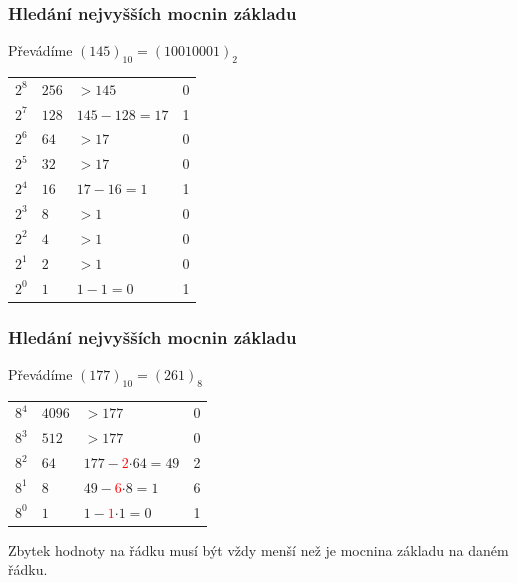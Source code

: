   \begin{frame}
    \frametitle{Hledání nejvyšších mocnin základu}
    \boldmath
    Převádíme $(145)_{10}=(10010001)_{2}$

		\begin{center}
      \begin{tabular}{p{10mm} p{15mm} p{50mm} | p{10mm}}
        $2^8$ & $256$ & $>145$ & 0 \\
        $2^7$ & $128$ & $145-128=17$ & 1 \\
        $2^6$ & $64$ & $>17$ & 0 \\
        $2^5$ & $32$ & $>17$ & 0 \\
        $2^4$ & $16$ & $17-16=1$ & 1 \\
        $2^3$ & $8$ & $>1$ & 0 \\
        $2^2$ & $4$ & $>1$ & 0 \\
        $2^1$ & $2$ & $>1$ & 0 \\
        $2^0$ & $1$ & $1-1 = 0$ & 1 \\
      \end{tabular}
    \end{center}
	\end{frame}
  
  \begin{frame}
    \frametitle{Hledání nejvyšších mocnin základu}
    \boldmath
    Převádíme $(177)_{10}=(261)_{8}$

		\begin{center}
      \begin{tabular}{p{10mm} p{15mm} p{50mm} | p{10mm}}
        $8^4$ & $4096$ & $>177$ & 0 \\
        $8^3$ & $512$ & $>177$ & 0 \\
        $8^2$ & $64$ & $177-$\textcolor{red}{$2$}$\cdot 64=49$ & 2 \\
        $8^1$ & $8$ & $49-$\textcolor{red}{$6$}$\cdot 8=1$ & 6 \\
        $8^0$ & $1$ & $1-$\textcolor{red}{$1$}$\cdot 1=0$ & 1 \\
      \end{tabular}
    \end{center}
    
    Zbytek hodnoty na řádku musí být vždy menší než je mocnina základu na daném řádku.
	\end{frame}
  
